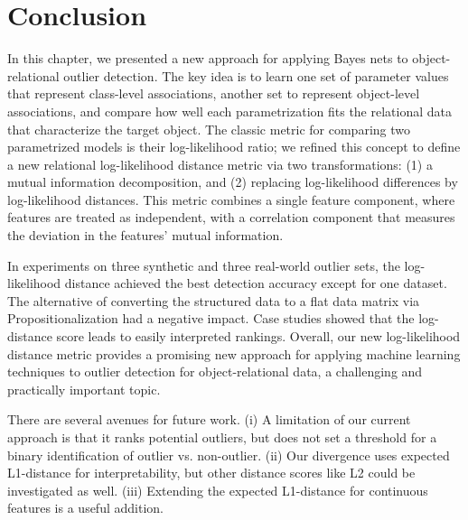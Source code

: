																		
																		
																\section{Conclusion}	
																In this chapter, we presented a new approach for applying Bayes nets to object-relational outlier detection. The key idea is to learn one set of parameter values that represent class-level associations, another set to represent object-level associations, and compare how well each parametrization fits the relational data that characterize the target object. The classic metric for comparing two parametrized models is their log-likelihood ratio; we refined this concept to define  a new relational log-likelihood distance metric via two transformations:  (1) a mutual information decomposition, and (2) replacing log-likelihood differences by log-likelihood distances. This metric combines a single feature component, where features are treated as independent, with a correlation component that measures the deviation in the features' mutual information.
																
																In experiments on three synthetic and three real-world outlier sets, the log-likelihood distance achieved the best detection accuracy except for one dataset. The alternative of converting the structured data to a flat data matrix via Propositionalization had a negative impact. %
																Case studies showed that the log-distance score leads to easily interpreted rankings.
																Overall, our new log-likelihood distance metric provides a promising new approach for applying machine learning techniques to outlier detection for object-relational data, a challenging and practically important topic. 
																
																
																There are several avenues for future work.  (i) A limitation of our current approach is that it ranks potential outliers, but does not set a threshold for a binary identification of outlier vs. non-outlier. (ii) Our divergence uses expected L1-distance for interpretability, but other distance scores like L2 could be investigated as well. (iii) Extending the expected L1-distance for continuous features is a useful addition. 
																
